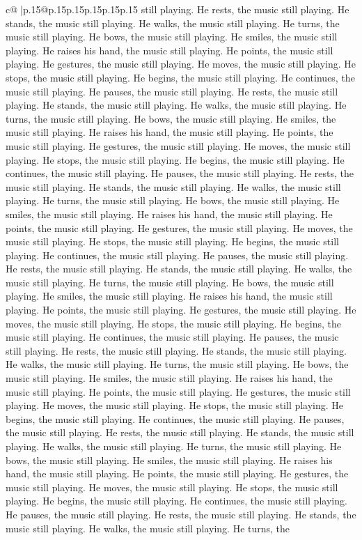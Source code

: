 \documentclass{article}
\begin{document}
{\begin{supertabular}{c@{$\;$}|p{.15\linewidth}@{}p{.15\linewidth}p{.15\linewidth}p{.15\linewidth}p{.15\linewidth}p{.15\linewidth}}
{{{still playing. He rests, the music still playing. He stands, the music still playing. He walks, the music still playing. He turns, the music still playing. He bows, the music still playing. He smiles, the music still playing. He raises his hand, the music still playing. He points, the music still playing. He gestures, the music still playing. He moves, the music still playing. He stops, the music still playing. He begins, the music still playing. He continues, the music still playing. He pauses, the music still playing. He rests, the music still playing. He stands, the music still playing. He walks, the music still playing. He turns, the music still playing. He bows, the music still playing. He smiles, the music still playing. He raises his hand, the music still playing. He points, the music still playing. He gestures, the music still playing. He moves, the music still playing. He stops, the music still playing. He begins, the music still playing. He continues, the music still playing. He pauses, the music still playing. He rests, the music still playing. He stands, the music still playing. He walks, the music still playing. He turns, the music still playing. He bows, the music still playing. He smiles, the music still playing. He raises his hand, the music still playing. He points, the music still playing. He gestures, the music still playing. He moves, the music still playing. He stops, the music still playing. He begins, the music still playing. He continues, the music still playing. He pauses, the music still playing. He rests, the music still playing. He stands, the music still playing. He walks, the music still playing. He turns, the music still playing. He bows, the music still playing. He smiles, the music still playing. He raises his hand, the music still playing. He points, the music still playing. He gestures, the music still playing. He moves, the music still playing. He stops, the music still playing. He begins, the music still playing. He continues, the music still playing. He pauses, the music still playing. He rests, the music still playing. He stands, the music still playing. He walks, the music still playing. He turns, the music still playing. He bows, the music still playing. He smiles, the music still playing. He raises his hand, the music still playing. He points, the music still playing. He gestures, the music still playing. He moves, the music still playing. He stops, the music still playing. He begins, the music still playing. He continues, the music still playing. He pauses, the music still playing. He rests, the music still playing. He stands, the music still playing. He walks, the music still playing. He turns, the music still playing. He bows, the music still playing. He smiles, the music still playing. He raises his hand, the music still playing. He points, the music still playing. He gestures, the music still playing. He moves, the music still playing. He stops, the music still playing. He begins, the music still playing. He continues, the music still playing. He pauses, the music still playing. He rests, the music still playing. He stands, the music still playing. He walks, the music still playing. He turns, the }}}
\end{supertabular}}
\end{document}

